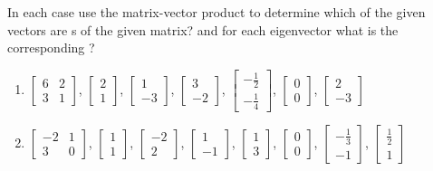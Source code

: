 \begin{exercise}
In each case use the matrix-vector product to determine which of the given vectors are s of the given matrix? and for each eigenvector what is the corresponding ?
\begin{enumerate}
\item \(\begin{bmatrix} 6&2\\3&1 \end{bmatrix}\),\quad
\(\begin{bmatrix}2\\1\end{bmatrix}\), \(\begin{bmatrix}1\\-3\end{bmatrix}\), \(\begin{bmatrix}3\\-2\end{bmatrix}\), \(\begin{bmatrix}-\frac12\\-\frac14\end{bmatrix}\), \(\begin{bmatrix}0\\0\end{bmatrix}\), \(\begin{bmatrix}2\\-3\end{bmatrix}\)

\item \(\begin{bmatrix} -2&1\\3&0 \end{bmatrix}\),\quad
\(\begin{bmatrix}1\\1\end{bmatrix}\), \(\begin{bmatrix}-2\\2\end{bmatrix}\), \(\begin{bmatrix}1\\-1\end{bmatrix}\), \(\begin{bmatrix}1\\3\end{bmatrix}\), \(\begin{bmatrix}0\\0\end{bmatrix}\), \(\begin{bmatrix}-\frac13\\-1\end{bmatrix}\), \(\begin{bmatrix}\frac12\\1\end{bmatrix}\)


\end{enumerate}
\end{exercise}

